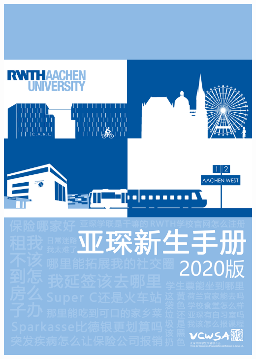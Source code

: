 \documentclass[a4paper,10pt,oneside]{scrbook}
\begin{document}
\frontmatter

\begin{titlepage}
\parindent=0pt
\includegraphics[width=\linewidth]{Bilder/Front_Cover_.png}
\end{titlepage}



\tableofcontents

\mainmatter








\end{document}
